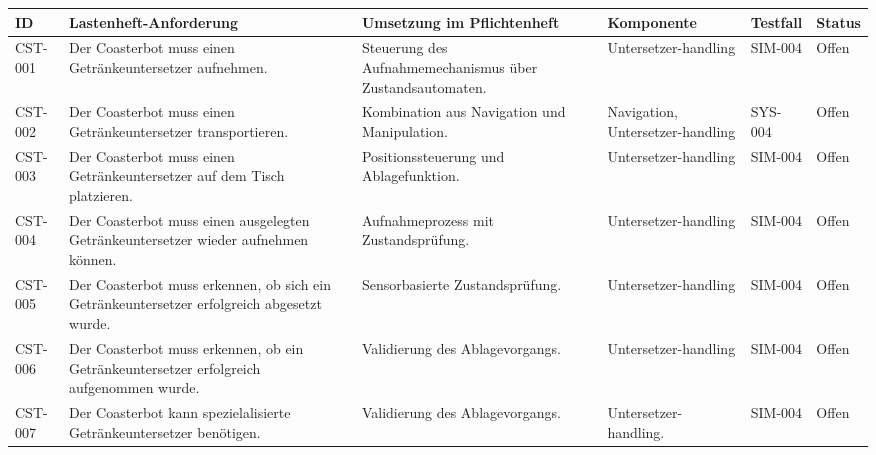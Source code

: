 \documentclass[
  a4paper,
  12pt,
  DIV=12,        %
  parskip=half,  %
  headings=small %
]{scrartcl}
\theoremstyle{definition}
\theoremstyle{definition}
\begin{document}
\begin{longtable}[]{@{}
  >{\raggedright\arraybackslash}p{}
  >{\raggedright\arraybackslash}p{}
  >{\raggedright\arraybackslash}p{}
  >{\raggedright\arraybackslash}p{}
  >{\raggedleft\arraybackslash}p{}
  >{\raggedright\arraybackslash}p{}@{}}
\toprule\noalign{}
\begin{minipage}[b]{\linewidth}\raggedright
ID
\end{minipage} & \begin{minipage}[b]{\linewidth}\raggedright
Lastenheft-Anforderung
\end{minipage} & \begin{minipage}[b]{\linewidth}\raggedright
Umsetzung im Pflichtenheft
\end{minipage} & \begin{minipage}[b]{\linewidth}\raggedright
Komponente
\end{minipage} & \begin{minipage}[b]{\linewidth}\raggedleft
Testfall
\end{minipage} & \begin{minipage}[b]{\linewidth}\raggedright
Status
\end{minipage} \\
\midrule\noalign{}
\endhead
\bottomrule\noalign{}
\endlastfoot
CST-001 & Der Coasterbot muss einen Getränkeuntersetzer aufnehmen. &
Steuerung des Aufnahmemechanismus über Zustandsautomaten. &
Untersetzer-handling & SIM-004 & Offen \\
CST-002 & Der Coasterbot muss einen Getränkeuntersetzer transportieren.
& Kombination aus Navigation und Manipulation. & Navigation,
Untersetzer-handling & SYS-004 & Offen \\
CST-003 & Der Coasterbot muss einen Getränkeuntersetzer auf dem Tisch
platzieren. & Positionssteuerung und Ablagefunktion. &
Untersetzer-handling & SIM-004 & Offen \\
CST-004 & Der Coasterbot muss einen ausgelegten Getränkeuntersetzer
wieder aufnehmen können. & Aufnahmeprozess mit Zustandsprüfung. &
Untersetzer-handling & SIM-004 & Offen \\
CST-005 & Der Coasterbot muss erkennen, ob sich ein Getränkeuntersetzer
erfolgreich abgesetzt wurde. & Sensorbasierte Zustandsprüfung. &
Untersetzer-handling & SIM-004 & Offen \\
CST-006 & Der Coasterbot muss erkennen, ob ein Getränkeuntersetzer
erfolgreich aufgenommen wurde. & Validierung des Ablagevorgangs. &
Untersetzer-handling & SIM-004 & Offen \\
CST-007 & Der Coasterbot kann spezielalisierte Getränkeuntersetzer
benötigen. & Validierung des Ablagevorgangs. & Untersetzer-handling. &
SIM-004 & Offen \\
\end{longtable}
\end{document}
